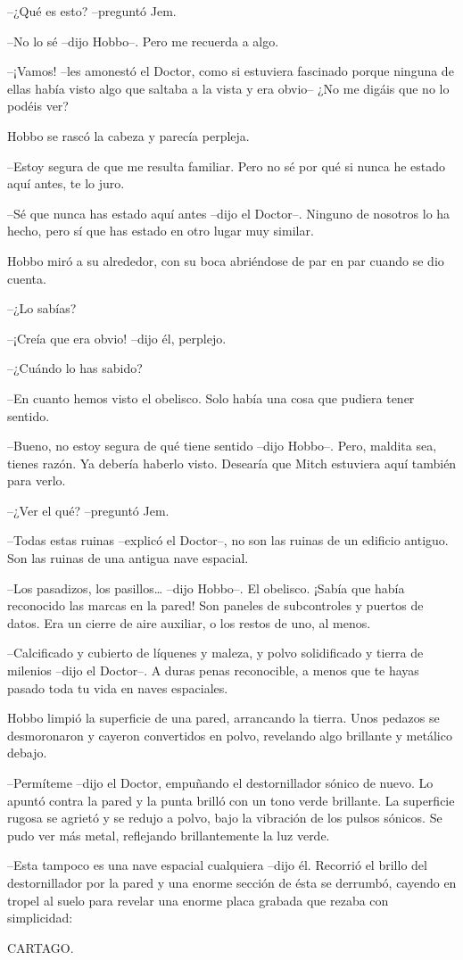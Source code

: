 {--¿Qué es esto? --preguntó Jem.}

{--No lo sé --dijo Hobbo--. Pero me recuerda a algo.}

{--¡Vamos! --les amonestó el Doctor, como si estuviera fascinado porque
 ninguna de ellas había visto algo que saltaba a la vista y era obvio--
¿No me digáis que no lo podéis ver?}

{Hobbo se rascó la cabeza y parecía perpleja.}

{--Estoy segura de que me resulta familiar. Pero no sé por qué si nunca
he estado aquí antes, te lo juro.}

{--Sé que nunca has estado aquí antes --dijo el Doctor--. Ninguno de
 nosotros lo ha hecho, pero sí que has estado en otro lugar muy
similar.}

{Hobbo miró a su alrededor, con su boca abriéndose de par en par cuando
se dio cuenta.}

{--¿Lo sabías?}

{--¡Creía que era obvio! --dijo él, perplejo.}

{--¿Cuándo lo has sabido?}

{--En cuanto hemos visto el obelisco. Solo había una cosa que pudiera
tener sentido.}

{--Bueno, no estoy segura de qué tiene sentido --dijo Hobbo--. Pero,
 maldita sea, tienes razón. Ya debería haberlo visto. Desearía que Mitch
estuviera aquí también para verlo.}

{--¿Ver el qué? --preguntó Jem.}

{--Todas estas ruinas --explicó el Doctor--, no son las ruinas de un
edificio antiguo. Son las ruinas de una antigua nave espacial.}

{--Los pasadizos, los pasillos\ldots{} --dijo Hobbo--. El obelisco.
 ¡Sabía que había reconocido las marcas en la pared! Son paneles de
 subcontroles y puertos de datos. Era un cierre de aire auxiliar, o los
restos de uno, al menos.}

{--Calcificado y cubierto de líquenes y maleza, y polvo solidificado y
 tierra de milenios --dijo el Doctor--. A duras penas reconocible, a
menos que te hayas pasado toda tu vida en naves espaciales.}

{Hobbo limpió la superficie de una pared, arrancando la tierra. Unos
 pedazos se desmoronaron y cayeron convertidos en polvo, revelando algo
brillante y metálico debajo.}

{--Permíteme --dijo el Doctor, empuñando el destornillador sónico de
 nuevo. Lo apuntó contra la pared y la punta brilló con un tono verde
 brillante. La superficie rugosa se agrietó y se redujo a polvo, bajo la
 vibración de los pulsos sónicos. Se pudo ver más metal, reflejando
brillantemente la luz verde.}

{--Esta tampoco es una nave espacial cualquiera --dijo él. Recorrió el
 brillo del destornillador por la pared y una enorme sección de ésta se
 derrumbó, cayendo en tropel al suelo para revelar una enorme placa
grabada que rezaba con simplicidad:}

{CARTAGO.}
